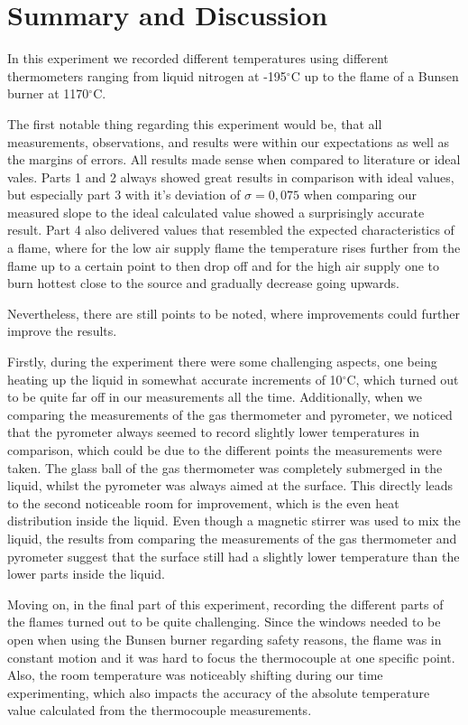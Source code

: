 \documentclass{article}
\begin{document}
\newpage
\section{Summary and Discussion}

In this experiment we recorded different temperatures using different thermometers ranging from liquid nitrogen at -195$^{\circ}$C up to the flame of a Bunsen burner at 1170$^{\circ}$C.

The first notable thing regarding this experiment would be, that all measurements, observations, and results were within our expectations as well as the margins of errors. All results made sense when compared to literature or ideal vales. Parts 1 and 2 always showed great results in comparison with ideal values, but especially part 3 with it's deviation of $\sigma = 0,075$ when comparing our measured slope to the ideal calculated value showed a surprisingly accurate result. Part 4 also delivered values that resembled the expected characteristics of a flame, where for the low air supply flame the temperature rises further from the flame up to a certain point to then drop off and for the high air supply one to burn hottest close to the source and gradually decrease going upwards.

Nevertheless, there are still points to be noted, where improvements could further improve the results.

Firstly, during the experiment there were some challenging aspects, one being heating up the liquid in somewhat accurate increments of 10$^{\circ}$C, which turned out to be quite far off in our measurements all the time. Additionally, when we comparing the measurements of the gas thermometer and pyrometer, we noticed that the pyrometer always seemed to record slightly lower temperatures in comparison, which could be due to the different points the measurements were taken. The glass ball of the gas thermometer was completely submerged in the liquid, whilst the pyrometer was always aimed at the surface. This directly leads to the second noticeable room for improvement, which is the even heat distribution inside the liquid. Even though a magnetic stirrer was used to mix the liquid, the results from comparing the measurements of the gas thermometer and pyrometer suggest that the surface still had a slightly lower temperature than the lower parts inside the liquid. 

Moving on, in the final part of this experiment, recording the different parts of the flames turned out to be quite challenging. Since the windows needed to be open when using the Bunsen burner regarding safety reasons, the flame was in constant motion and it was hard to focus the thermocouple at one specific point. Also, the room temperature was noticeably shifting during our time experimenting, which also impacts the accuracy of the absolute temperature value calculated from the thermocouple measurements.
\end{document}
